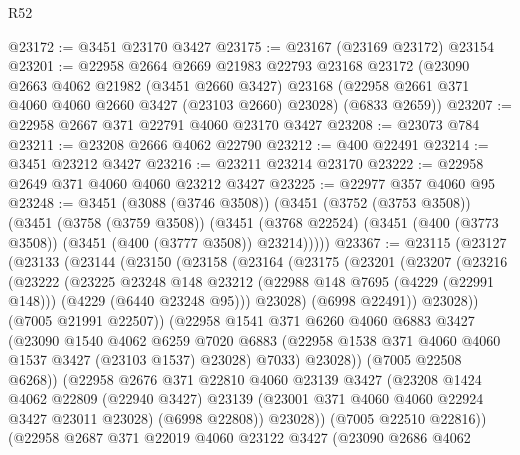\begin{lexlean}{R52}
\begin{coremodule}
@23172 := @3451 @23170 @3427
@23175 := @23167 (@23169 @23172) @23154
@23201 := @22958
    @2664
    @2669
    @21983
    @22793
    @23168
    @23172
    (@23090
      @2663
      @4062
      @21982
      (@3451 @2660 @3427)
      @23168
      (@22958 @2661 @371 @4060 @4060 @2660 @3427 (@23103 @2660) @23028)
      (@6833 @2659))
@23207 := @22958 @2667 @371 @22791 @4060 @23170 @3427
@23208 := @23073 @784
@23211 := @23208 @2666 @4062 @22790
@23212 := @400 @22491
@23214 := @3451 @23212 @3427
@23216 := @23211 @23214 @23170
@23222 := @22958 @2649 @371 @4060 @4060 @23212 @3427
@23225 := @22977 @357 @4060 @95
@23248 := @3451
    (@3088 (@3746 @3508))
    (@3451
      (@3752 (@3753 @3508))
      (@3451
        (@3758 (@3759 @3508))
        (@3451 (@3768 @22524) (@3451 (@400 (@3773 @3508)) (@3451 (@400 (@3777 @3508)) @23214)))))
@23367 := @23115
    (@23127
      (@23133
        (@23144
          (@23150
            (@23158
              (@23164
                (@23175
                  (@23201
                    (@23207
                      (@23216
                        (@23222
                          (@23225
                            @23248
                            @148
                            @23212
                            (@22988 @148 @7695 (@4229 (@22991 @148)))
                            (@4229 (@6440 @23248 @95)))
                          @23028)
                        (@6998 @22491))
                      @23028))
                  (@7005 @21991 @22507))
                (@22958
                  @1541
                  @371
                  @6260
                  @4060
                  @6883
                  @3427
                  (@23090
                    @1540
                    @4062
                    @6259
                    @7020
                    @6883
                    (@22958 @1538 @371 @4060 @4060 @1537 @3427 (@23103 @1537) @23028)
                    @7033)
                  @23028))
              (@7005 @22508 @6268))
            (@22958
              @2676
              @371
              @22810
              @4060
              @23139
              @3427
              (@23208
                @1424
                @4062
                @22809
                (@22940 @3427)
                @23139
                (@23001 @371 @4060 @4060 @22924 @3427 @23011 @23028)
                (@6998 @22808))
              @23028))
          (@7005 @22510 @22816))
        (@22958
          @2687
          @371
          @22019
          @4060
          @23122
          @3427
          (@23090
            @2686
            @4062

\end{coremodule}
\end{lexlean}
